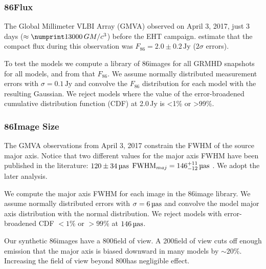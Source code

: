 \subsubsection{86\GHz Flux}

The Global Millimeter VLBI Array (GMVA) observed \sgra on April 3, 2017, just 3 days ($\approx \no{13000}\,\tg$) before the EHT campaign.
\citet{2019ApJ...871...30I} estimate that the compact flux during this observation was $F_{86} = 2.0 \pm 0.2\,\mathrm{Jy}$ ($2\sigma$ errors).

To test the models we compute a library of 86\GHz images for all GRMHD snapshots for all models, and from that $F_{86}$.
We assume normally distributed measurement errors with $\sigma = 0.1\,\mathrm{Jy}$ and convolve the $F_{86}$ distribution for each model with the resulting Gaussian.
We reject models where the value of the error-broadened cumulative distribution function (CDF) at 2.0\,Jy is <1\% or >99\%.

\subsubsection{86\GHz Image Size}\label{sec:86size}

The GMVA observations from April 3, 2017 constrain the FWHM of the source major axis.
Notice that two different values for the major axis FWHM have been published in the literature: $120 \pm 34\uas$ \citep{2019ApJ...871...30I}
${\rm FWHM}_{maj} = 146^{+11}_{-12}\uas$ \citep[95\% confidence][]{2021ApJ...915...99I}.
We adopt the later analysis.

We compute the major axis FWHM for each image in the 86\GHz image library.
We assume normally distributed errors with $\sigma = 6\uas$ and convolve the model major axis distribution with the normal distribution.
We reject models with error-broadened CDF $< 1\%$ or $> 99\%$ at $146\uas$.

Our synthetic 86\GHz images have a 800\uas field of view.
A 200\uas field of view cuts off enough emission that the major axis is biased downward in many models by $\sim 20\%$.
Increasing the field of view beyond 800\uas has negligible effect.

